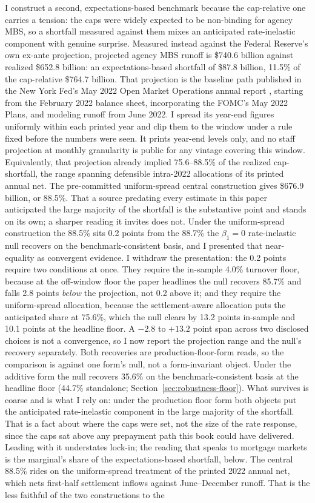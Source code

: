 \documentclass[12pt]{article}
\begin{document}
I construct a second, expectations-based benchmark because the cap-relative one carries a tension: the caps were widely expected to be non-binding for agency MBS, so a shortfall measured against them mixes an anticipated rate-inelastic component with genuine surprise. Measured instead against the Federal Reserve's own ex-ante projection, projected agency MBS runoff is \$740.6 billion against realized \$652.8 billion: an expectations-based shortfall of \$87.8 billion, 11.5\% of the cap-relative \$764.7 billion. That projection is the baseline path published in the New York Fed's May 2022 Open Market Operations annual report \citep{omo2021}, starting from the February 2022 balance sheet, incorporating the FOMC's May 2022 Plans, and modeling runoff from June 2022. I spread its year-end figures uniformly within each printed year and clip them to the window under a rule fixed before the numbers were seen. It prints year-end levels only, and no staff projection at monthly granularity is public for any vintage covering this window. Equivalently, that projection already implied 75.6--88.5\% of the realized cap-shortfall, the range spanning defensible intra-2022 allocations of its printed annual net. The pre-committed uniform-spread central construction gives \$676.9 billion, or 88.5\%. That a source predating every estimate in this paper anticipated the large majority of the shortfall is the substantive point and stands on its own; a sharper reading it invites does not. Under the uniform-spread construction the 88.5\% sits 0.2 points from the 88.7\% the $\beta_1 = 0$ rate-inelastic null recovers on the benchmark-consistent basis, and I presented that near-equality as convergent evidence. I withdraw the presentation: the 0.2 points require two conditions at once. They require the in-sample 4.0\% turnover floor, because at the off-window floor the paper headlines the null recovers 85.7\% and falls 2.8 points \emph{below} the projection, not 0.2 above it; and they require the uniform-spread allocation, because the settlement-aware allocation puts the anticipated share at 75.6\%, which the null clears by 13.2 points in-sample and 10.1 points at the headline floor. A $-2.8$ to $+13.2$ point span across two disclosed choices is not a convergence, so I now report the projection range and the null's recovery separately. Both recoveries are production-floor-form reads, so the comparison is against one form's null, not a form-invariant object. Under the additive form the null recovers 35.6\% on the benchmark-consistent basis at the headline floor (44.7\% standalone; Section~\ref{sec:robustness-floor}). What survives is coarse and is what I rely on: under the production floor form both objects put the anticipated rate-inelastic component in the large majority of the shortfall. That is a fact about where the caps were set, not the size of the rate response, since the caps sat above any prepayment path this book could have delivered. Leading with it understates lock-in; the reading that speaks to mortgage markets is the marginal's share of the expectations-based shortfall, below. The central 88.5\% rides on the uniform-spread treatment of the printed 2022 annual net, which nets first-half settlement inflows against June--December runoff. That is the less faithful of the two constructions to the 
\end{document}
